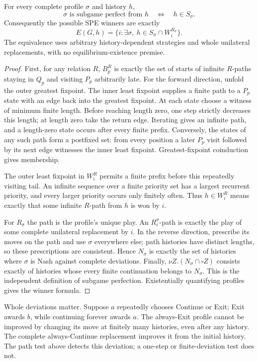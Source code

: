 \begin{theorem}\label{olv:thm:infinite-fixpoints}
For every complete profile $\sigma$ and history $h$,
\[
 \sigma\text{ is subgame perfect from }h
 \quad\Longleftrightarrow\quad h\in S_\sigma.
\]
Consequently the possible SPE winners are exactly
\[
 E(G,h)=\{i:\exists\sigma,\ h\in S_\sigma\cap W_i^{R_\sigma}\}.
\]
The equivalence uses arbitrary history-dependent strategies and whole
unilateral replacements, with no equilibrium-existence premise.
\end{theorem}
\begin{proof}
First, for any relation $R$, $B_p^R$ is exactly the set of starts of
infinite $R$-paths staying in $Q_p$ and visiting $P_p$ arbitrarily late.
For the forward direction, unfold the outer greatest fixpoint. The
inner least fixpoint supplies a finite path to a $P_p$ state with
an edge back into the greatest fixpoint. At each state choose a
witness of minimum finite length. Before reaching length zero,
one step strictly decreases this length; at length zero take the
return edge. Iterating gives an infinite path, and a length-zero
state occurs after every finite prefix. Conversely, the states of
any such path form a postfixed set: from every position a later
$P_p$ visit followed by its next edge witnesses the inner least
fixpoint. Greatest-fixpoint coinduction gives membership.

The outer least fixpoint in $W_i^R$ permits a finite prefix before
this repeatedly visiting tail. An infinite sequence over a finite priority set has a
largest recurrent priority, and every larger priority occurs only
finitely often. Thus $h\in W_i^R$ means exactly that some infinite
$R$-path from $h$ is won by $i$.

For $R_\sigma$ the path is the profile's unique play. An
$R_i^\sigma$-path is exactly the play of some complete unilateral
replacement by $i$. In the reverse direction, prescribe its moves
on the path and use $\sigma$ everywhere else; path histories have
distinct lengths, so these prescriptions are consistent. Hence
$N_\sigma$ is exactly the set of histories where $\sigma$ is Nash
against complete deviations. Finally,
$\nu Z.(N_\sigma\cap\square Z)$ consists exactly of histories
whose every finite continuation belongs to $N_\sigma$. This is
the independent definition of subgame perfection. Existentially
quantifying profiles gives the winner formula.
\end{proof}

Whole deviations matter. Suppose $a$ repeatedly chooses Continue or
Exit; Exit awards $b$, while continuing forever awards $a$. The
always-Exit profile cannot be improved by changing its move at finitely
many histories, even after any history. The complete always-Continue
replacement improves it from the initial history. The path test above
detects this deviation; a one-step or finite-deviation test does not.

